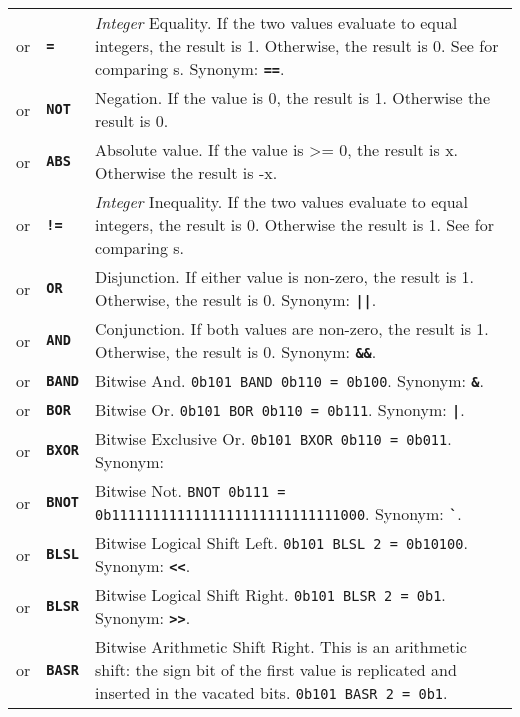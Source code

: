 \documentclass{article}
\def\ttref#1{\ahrefloc{#1}{\tt #1}}
\def\DEFINE#1{{\tt \bf #1}\label{#1}\index{#1}}
\def\DEFSYN#1{{\tt \bf #1}\index{#1}}
\def\t#1{{\tt #1}}
\def\textexcl{!}
\def\textpipe{|}
\begin{document}
\begin{tabular}{cp{10in}|p{10in}}
or & \ttref{value} \DEFINE{=} \ttref{value} & \emph{Integer} Equality. If the two
values evaluate to equal integers, the result is 1. Otherwise, the result
is 0. See \ttref{STRING!COMPARE} for comparing \ttref{String}s. Synonym:
\DEFSYN{==}.
\\
or & \DEFINE{NOT} \ttref{value} & Negation. If the value is 0, the result is 1.
Otherwise the result is 0. \\
or & \DEFINE{ABS} \ttref{Value} & Absolute value. If the value is >= 0, the result
is x. Otherwise the result is -x. \\
or & \ttref{value} \DEFINE{\textexcl=} \ttref{value} & \emph{Integer} Inequality. If
the two values evaluate to equal integers, the result is 0. Otherwise the
result is 1. See \ttref{STRING!COMPARE} for comparing \ttref{String}s. \\
or & \ttref{value} \DEFINE{OR} \ttref{value} & Disjunction. If either value is
non-zero, the result is 1. Otherwise, the result is 0. Synonym: \DEFSYN{\textpipe\textpipe}. \\
or & \ttref{value} \DEFINE{AND} \ttref{value} & Conjunction. If both values are
non-zero, the result is 1. Otherwise, the result is 0. Synonym: \DEFSYN{\&\&}. \\

or & \ttref{value} \DEFINE{BAND} \ttref{value} & Bitwise And.
\t{0b101 BAND 0b110 = 0b100}. Synonym: \DEFSYN{\&}.\\
or & \ttref{value} \DEFINE{BOR} \ttref{value} & Bitwise Or.
\t{0b101 BOR 0b110 = 0b111}. Synonym: \DEFSYN{\textpipe}. \\
or & \ttref{value} \DEFINE{BXOR} \ttref{value} & Bitwise Exclusive Or.
\t{0b101 BXOR 0b110 = 0b011}. Synonym: \DEFSYN{^^}.  \\
or & \DEFINE{BNOT} \ttref{value} & Bitwise Not.
\t{BNOT 0b111 = 0b1111111111111111111111111111000}. Synonym: \DEFSYN{\verb+`+}. \\
or & \ttref{value} \DEFINE{BLSL} \ttref{value} & Bitwise Logical Shift Left.
\t{0b101 BLSL 2 = 0b10100}. Synonym: \DEFSYN{<<}. \\
or & \ttref{value} \DEFINE{BLSR} \ttref{value} & Bitwise Logical Shift Right.
\t{0b101 BLSR 2 = 0b1}. Synonym: \DEFSYN{>>}. \\
or & \ttref{value} \DEFINE{BASR} \ttref{value} & Bitwise Arithmetic Shift Right.
This is an arithmetic shift: the sign bit of the first value is replicated
and inserted in the vacated bits. \t{0b101 BASR 2 = 0b1}.  \\


\end{tabular}
\end{document}
